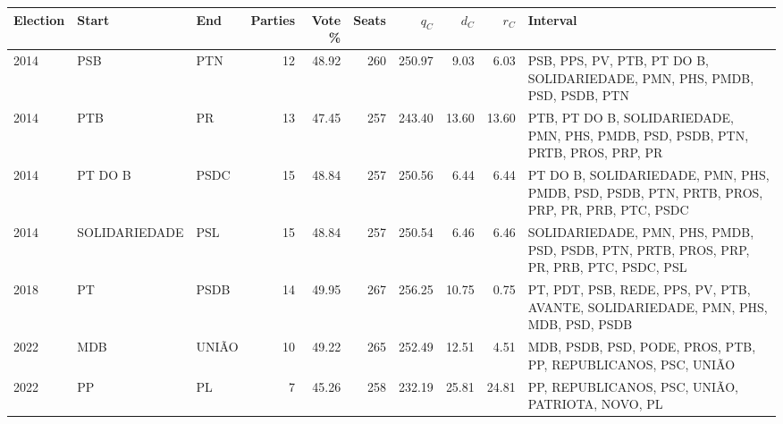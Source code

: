 \begin{tabularx}{\textwidth}{@{}lllrrrrrr>{\raggedright\arraybackslash}X@{}}
\toprule
Election & Start & End & Parties & Vote \% & Seats & \(q_C\) & \(d_C\) & \(r_C\) & Interval \\
\midrule
2014 & PSB & PTN & 12 & 48.92 & 260 & 250.97 & 9.03 & 6.03 & PSB, PPS, PV, PTB, PT DO B, SOLIDARIEDADE, PMN, PHS, PMDB, PSD, PSDB, PTN \\
2014 & PTB & PR & 13 & 47.45 & 257 & 243.40 & 13.60 & 13.60 & PTB, PT DO B, SOLIDARIEDADE, PMN, PHS, PMDB, PSD, PSDB, PTN, PRTB, PROS, PRP, PR \\
2014 & PT DO B & PSDC & 15 & 48.84 & 257 & 250.56 & 6.44 & 6.44 & PT DO B, SOLIDARIEDADE, PMN, PHS, PMDB, PSD, PSDB, PTN, PRTB, PROS, PRP, PR, PRB, PTC, PSDC \\
2014 & SOLIDARIEDADE & PSL & 15 & 48.84 & 257 & 250.54 & 6.46 & 6.46 & SOLIDARIEDADE, PMN, PHS, PMDB, PSD, PSDB, PTN, PRTB, PROS, PRP, PR, PRB, PTC, PSDC, PSL \\
2018 & PT & PSDB & 14 & 49.95 & 267 & 256.25 & 10.75 & 0.75 & PT, PDT, PSB, REDE, PPS, PV, PTB, AVANTE, SOLIDARIEDADE, PMN, PHS, MDB, PSD, PSDB \\
2022 & MDB & UNIÃO & 10 & 49.22 & 265 & 252.49 & 12.51 & 4.51 & MDB, PSDB, PSD, PODE, PROS, PTB, PP, REPUBLICANOS, PSC, UNIÃO \\
2022 & PP & PL & 7 & 45.26 & 258 & 232.19 & 25.81 & 24.81 & PP, REPUBLICANOS, PSC, UNIÃO, PATRIOTA, NOVO, PL \\
\bottomrule
\end{tabularx}
